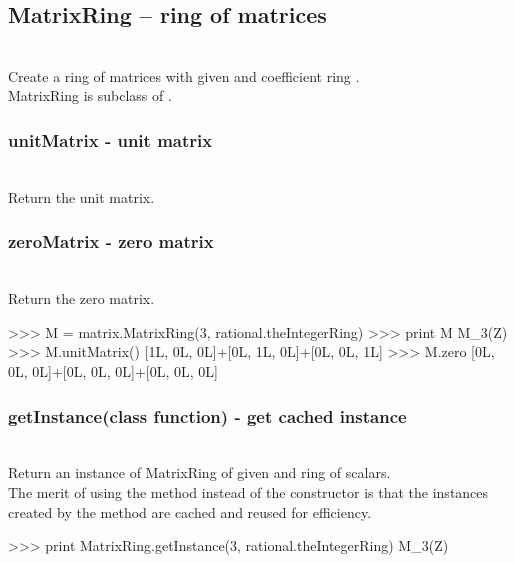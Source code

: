 \subsection{\negok MatrixRing -- ring of matrices}
  \\
  \spacing
  \quad Create a ring of matrices with given  and coefficient ring .\\
  \spacing
  \quad MatrixRing is subclass of .\\
  \spacing
 \method
  \subsubsection{unitMatrix - unit matrix}
   \\
   \spacing
   \quad Return the unit matrix.\\
   \spacing
  \subsubsection{zeroMatrix - zero matrix}
   \\
   \spacing
   \quad Return the zero matrix.\\
   \spacing
\begin{ex}
>>> M = matrix.MatrixRing(3, rational.theIntegerRing)
>>> print M
M_3(Z)
>>> M.unitMatrix()
[1L, 0L, 0L]+[0L, 1L, 0L]+[0L, 0L, 1L]
>>> M.zero
[0L, 0L, 0L]+[0L, 0L, 0L]+[0L, 0L, 0L]
\end{ex}
\C
 \subsubsection{getInstance(class function) - get cached instance}
   \\
   \spacing
   \quad Return an instance of MatrixRing of given  and ring of scalars. \\
   \spacing
   \quad The merit of using the method instead of the constructor is that the instances created by the method are cached and reused for efficiency.\\
   \spacing
\begin{ex}
>>> print MatrixRing.getInstance(3, rational.theIntegerRing)
M_3(Z)
\end{ex}
\C

